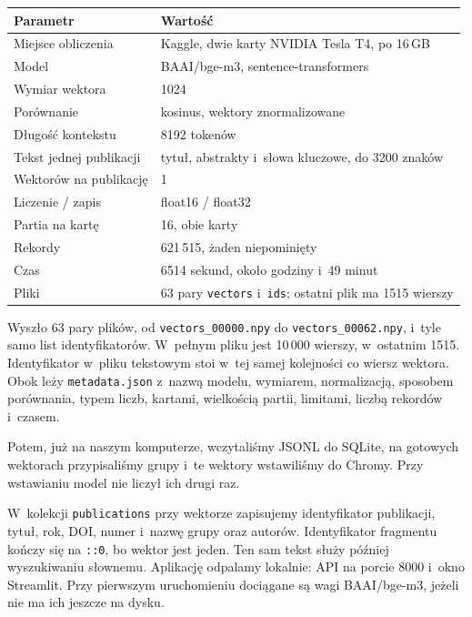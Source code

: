 \documentclass[11pt,a4paper]{article}
\begin{document}
\begin{center}
\begin{tabularx}{\textwidth}{|L{0.36\textwidth}|Y|}
\hline
\textbf{Parametr} & \textbf{Wartość} \\
\hline
Miejsce obliczenia & Kaggle, dwie karty NVIDIA Tesla T4, po 16\,GB \\
\hline
Model & BAAI/bge-m3, sentence-transformers \\
\hline
Wymiar wektora & 1024 \\
\hline
Porównanie & kosinus, wektory znormalizowane \\
\hline
Długość kontekstu & 8192 tokenów \\
\hline
Tekst jednej publikacji & tytuł, abstrakty i~słowa kluczowe, do 3200 znaków \\
\hline
Wektorów na publikację & 1 \\
\hline
Liczenie / zapis & float16 / float32 \\
\hline
Partia na kartę & 16, obie karty \\
\hline
Rekordy & 621\,515, żaden niepominięty \\
\hline
Czas & 6514 sekund, około godziny i~49 minut \\
\hline
Pliki & 63 pary \texttt{vectors} i~\texttt{ids}; ostatni plik ma 1515 wierszy \\
\hline
\end{tabularx}
\end{center}

Wyszło 63 pary plików, od \texttt{vectors\_00000.npy} do \texttt{vectors\_00062.npy}, i~tyle samo list identyfikatorów. W~pełnym pliku jest 10\,000 wierszy, w~ostatnim 1515. Identyfikator w~pliku tekstowym stoi w~tej samej kolejności co wiersz wektora. Obok leży \texttt{metadata.json} z~nazwą modelu, wymiarem, normalizacją, sposobem porównania, typem liczb, kartami, wielkością partii, limitami, liczbą rekordów i~czasem.

Potem, już na naszym komputerze, wczytaliśmy JSONL do SQLite, na gotowych wektorach przypisaliśmy grupy i~te wektory wstawiliśmy do Chromy. Przy wstawianiu model nie liczył ich drugi raz.

W~kolekcji \texttt{publications} przy wektorze zapisujemy identyfikator publikacji, tytuł, rok, DOI, numer i~nazwę grupy oraz autorów. Identyfikator fragmentu kończy się na \texttt{::0}, bo wektor jest jeden. Ten sam tekst służy później wyszukiwaniu słownemu. Aplikację odpalamy lokalnie: API na porcie 8000 i~okno Streamlit. Przy pierwszym uruchomieniu dociągane są wagi BAAI/bge-m3, jeżeli nie ma ich jeszcze na dysku.
\end{document}
